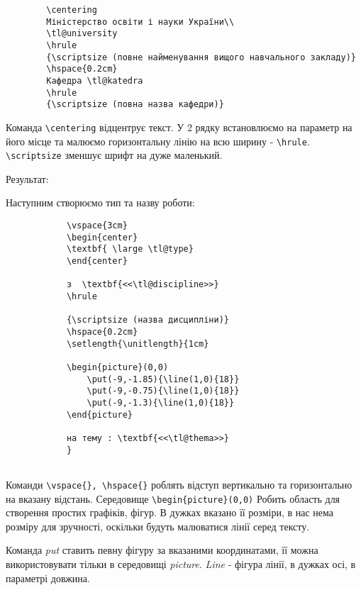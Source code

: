 \begin{lstlisting}
		\centering
		Міністерство освіти і науки України\\
		\tl@university
		\hrule
		{\scriptsize (повне найменування вищого навчального закладу)}
		\hspace{0.2cm}
		Кафедра \tl@katedra
		\hrule
		{\scriptsize (повна назва кафедри)}
\end{lstlisting}

Команда \verb|\centering| відцентрує текст. У 2 рядку встановлюємо на параметр на його місце та малюємо горизонтальну лінію на всю ширину - \verb|\hrule|. \verb|\scriptsize| зменшує шрифт на дуже маленький.

Результат:


Наступним створюємо тип та назву роботи:

\begin{lstlisting}
			\vspace{3cm}
			\begin{center}
			\textbf{ \large \tl@type}
			\end{center}
			
			з  \textbf{<<\tl@discipline>>}
			\hrule
			
			{\scriptsize (назва дисципліни)}
			\hspace{0.2cm}
			\setlength{\unitlength}{1cm}
			
			\begin{picture}(0,0)
				\put(-9,-1.85){\line(1,0){18}}
				\put(-9,-0.75){\line(1,0){18}}
				\put(-9,-1.3){\line(1,0){18}}
			\end{picture}
			
			на тему : \textbf{<<\tl@thema>>}
			}			
					
\end{lstlisting}

Команди \verb|\vspace{}, \hspace{}| роблять відступ вертикально та горизонтально на вказану відстань. Середовище \verb|\begin{picture}(0,0)| Робить область для створення простих графіків, фігур. В дужках вказано її розміри, в нас нема розміру для зручності, оскільки будуть малюватися лінії серед тексту. 

Команда \textit{put} ставить певну фігуру за вказаними координатами, її можна використовувати тільки в середовищі \textit{picture}. \textit{Line} - фігура лінії, в дужках осі, в параметрі довжина.

